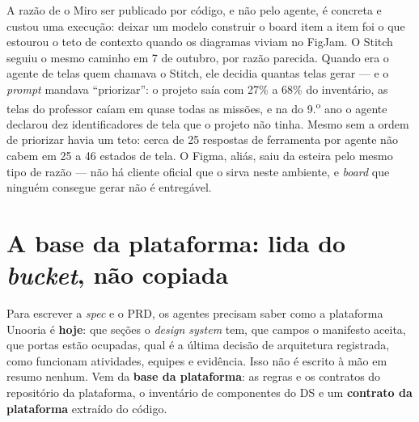 \documentclass[11pt,a4paper]{article}
\begin{document}
A razão de o Miro ser publicado por código, e não pelo agente, é concreta e custou uma execução: deixar um modelo construir o board item a item foi o que estourou o teto de contexto quando os diagramas viviam no FigJam. O Stitch seguiu o mesmo caminho em 7 de outubro, por razão parecida. Quando era o agente de telas quem chamava o Stitch, ele decidia quantas telas gerar --- e o \emph{prompt} mandava ``priorizar'': o projeto saía com 27\% a 68\% do inventário, as telas do professor caíam em quase todas as missões, e na do 9.\textsuperscript{o} ano o agente declarou dez identificadores de tela que o projeto não tinha. Mesmo sem a ordem de priorizar havia um teto: cerca de 25 respostas de ferramenta por agente não cabem em 25 a 46 estados de tela. O Figma, aliás, saiu da esteira pelo mesmo tipo de razão --- não há cliente oficial que o sirva neste ambiente, e \emph{board} que ninguém consegue gerar não é entregável.

\section{A base da plataforma: lida do \emph{bucket}, não copiada}
\label{sec:base}

Para escrever a \emph{spec} e o PRD, os agentes precisam saber como a plataforma Unooria é \textbf{hoje}: que seções o \emph{design system} tem, que campos o manifesto aceita, que portas estão ocupadas, qual é a última decisão de arquitetura registrada, como funcionam atividades, equipes e evidência. Isso não é escrito à mão em resumo nenhum. Vem da \textbf{base da plataforma}: as regras e os contratos do repositório da plataforma, o inventário de componentes do DS e um \textbf{contrato da plataforma} extraído do código.
\end{document}
